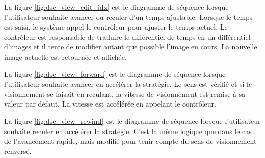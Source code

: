 La figure \ref{fig:dsc_view_edit_idx} est le diagramme de séquence lorsque l'utilisateur souhaite avancer ou reculer d'un temps ajustable.
Lorsque le temps est saisi, le système appel le contrôleur pour ajuster le temps actuel.
Le contrôleur est responsable de traduire le différentiel de temps en un différentiel d'images et il tente de modifier autant que possible l'image en cours.
La nouvelle image actuelle est retournée et affichée.


La figure \ref{fig:dsc_view_forward} est le diagramme de séquence lorsque l'utilisateur souhaite avancer en accélérer la stratégie.
Le sens est vérifié et si le visionnement se faisait en reculant, la vitesse de visionnement est remise à sa valeur par défaut.
La vitesse est accélérée en appelant le contrôleur.


La figure \ref{fig:dsc_view_rewind} est le diagramme de séquence lorsque l'utilisateur souhaite reculer en accélérer la stratégie.
C'est la même logique que dans le cas de l'avancement rapide, mais modifié pour tenir compte du sens de visionnement renversé.
